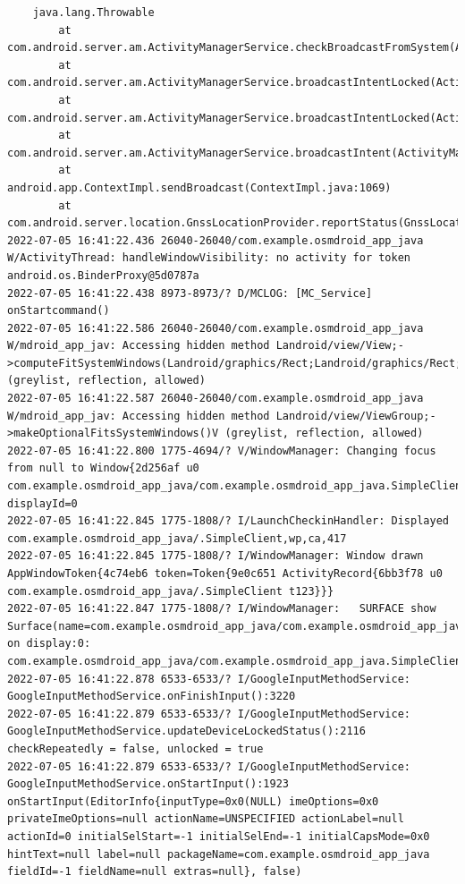 \documentclass[a4paper,12pt]{book}
\begin{document}
\begin{lstlisting}
    java.lang.Throwable
        at com.android.server.am.ActivityManagerService.checkBroadcastFromSystem(ActivityManagerService.java:15425)
        at com.android.server.am.ActivityManagerService.broadcastIntentLocked(ActivityManagerService.java:16073)
        at com.android.server.am.ActivityManagerService.broadcastIntentLocked(ActivityManagerService.java:15442)
        at com.android.server.am.ActivityManagerService.broadcastIntent(ActivityManagerService.java:16227)
        at android.app.ContextImpl.sendBroadcast(ContextImpl.java:1069)
        at com.android.server.location.GnssLocationProvider.reportStatus(GnssLocationProvider.java:1497)
2022-07-05 16:41:22.436 26040-26040/com.example.osmdroid_app_java W/ActivityThread: handleWindowVisibility: no activity for token android.os.BinderProxy@5d0787a
2022-07-05 16:41:22.438 8973-8973/? D/MCLOG: [MC_Service] onStartcommand()
2022-07-05 16:41:22.586 26040-26040/com.example.osmdroid_app_java W/mdroid_app_jav: Accessing hidden method Landroid/view/View;->computeFitSystemWindows(Landroid/graphics/Rect;Landroid/graphics/Rect;)Z (greylist, reflection, allowed)
2022-07-05 16:41:22.587 26040-26040/com.example.osmdroid_app_java W/mdroid_app_jav: Accessing hidden method Landroid/view/ViewGroup;->makeOptionalFitsSystemWindows()V (greylist, reflection, allowed)
2022-07-05 16:41:22.800 1775-4694/? V/WindowManager: Changing focus from null to Window{2d256af u0 com.example.osmdroid_app_java/com.example.osmdroid_app_java.SimpleClient} displayId=0
2022-07-05 16:41:22.845 1775-1808/? I/LaunchCheckinHandler: Displayed com.example.osmdroid_app_java/.SimpleClient,wp,ca,417
2022-07-05 16:41:22.845 1775-1808/? I/WindowManager: Window drawn AppWindowToken{4c74eb6 token=Token{9e0c651 ActivityRecord{6bb3f78 u0 com.example.osmdroid_app_java/.SimpleClient t123}}}
2022-07-05 16:41:22.847 1775-1808/? I/WindowManager:   SURFACE show Surface(name=com.example.osmdroid_app_java/com.example.osmdroid_app_java.SimpleClient)/@0xb3976a8 on display:0: com.example.osmdroid_app_java/com.example.osmdroid_app_java.SimpleClient
2022-07-05 16:41:22.878 6533-6533/? I/GoogleInputMethodService: GoogleInputMethodService.onFinishInput():3220 
2022-07-05 16:41:22.879 6533-6533/? I/GoogleInputMethodService: GoogleInputMethodService.updateDeviceLockedStatus():2116 checkRepeatedly = false, unlocked = true
2022-07-05 16:41:22.879 6533-6533/? I/GoogleInputMethodService: GoogleInputMethodService.onStartInput():1923 onStartInput(EditorInfo{inputType=0x0(NULL) imeOptions=0x0 privateImeOptions=null actionName=UNSPECIFIED actionLabel=null actionId=0 initialSelStart=-1 initialSelEnd=-1 initialCapsMode=0x0 hintText=null label=null packageName=com.example.osmdroid_app_java fieldId=-1 fieldName=null extras=null}, false)

\end{lstlisting}
\end{document}
